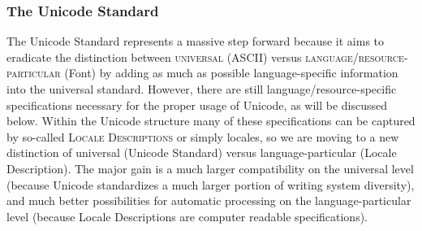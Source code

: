 \subsubsection*{The Unicode Standard}

The Unicode Standard represents a massive step forward because it aims to
eradicate the distinction between \textsc{universal} (ASCII) versus
\textsc{language/resource-particular} (Font) by adding as much as possible
language-specific information into the universal standard. However, there are
still language/resource-specific specifications necessary for the proper usage
of Unicode, as will be discussed below. Within the Unicode structure many of
these specifications can be captured by so-called \textsc{Locale Descriptions}
or simply locales, so we are moving to a new distinction of universal (Unicode
Standard) versus language-particular (Locale Description). The major gain is a
much larger compatibility on the universal level (because Unicode standardizes a
much larger portion of writing system diversity), and much better possibilities
for automatic processing on the language-particular level (because Locale
Descriptions are computer readable specifications).


